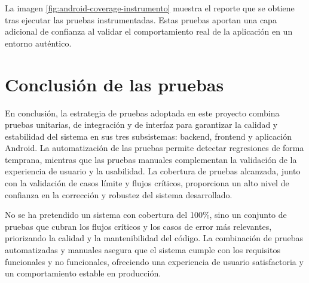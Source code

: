 La imagen \ref{fig:android-coverage-instrumento} muestra el reporte que se obtiene tras ejecutar las pruebas instrumentadas. Estas pruebas aportan una capa adicional de confianza al validar el comportamiento real de la aplicación en un entorno auténtico.


\newpage
\section{Conclusión de las pruebas}

En conclusión, la estrategia de pruebas adoptada en este proyecto combina pruebas unitarias, de integración y de interfaz para garantizar la calidad y estabilidad del sistema en sus tres subsistemas: backend, frontend y aplicación Android. La automatización de las pruebas permite detectar regresiones de forma temprana, mientras que las pruebas manuales complementan la validación de la experiencia de usuario y la usabilidad. La cobertura de pruebas alcanzada, junto con la validación de casos límite y flujos críticos, proporciona un alto nivel de confianza en la corrección y robustez del sistema desarrollado.

No se ha pretendido un sistema con cobertura del 100\%, sino un conjunto de pruebas que cubran los flujos críticos y los casos de error más relevantes, priorizando la calidad y la mantenibilidad del código. La combinación de pruebas automatizadas y manuales asegura que el sistema cumple con los requisitos funcionales y no funcionales, ofreciendo una experiencia de usuario satisfactoria y un comportamiento estable en producción.

